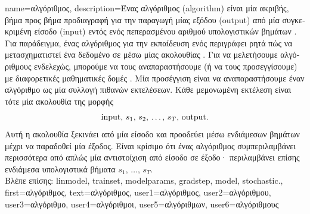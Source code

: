 {name={\foreignlanguage{greek}{αλγόριθμος}},
 	description={\foreignlanguage{greek}{Ένας} 
		\foreignlanguage{greek}{αλγόριθμος} (algorithm) \foreignlanguage{greek}{είναι μία ακριβής, βήμα προς βήμα προδιαγραφή για την  
		παραγωγή μίας εξόδου} (output) \foreignlanguage{greek}{από μία συγκεκριμένη είσοδο} (input) \foreignlanguage{greek}{εντός ενός πεπερασμένου 
		αριθμού υπολογιστικών βημάτων} \cite{Cormen:2022aa}. \foreignlanguage{greek}{Για παράδειγμα, ένας αλγόριθμος για την εκπαίδευση ενός} 
		 \foreignlanguage{greek}{περιγράφει ρητά πώς να μετασχηματιστεί ένα δεδομένο}  
		\foreignlanguage{greek}{σε}  \foreignlanguage{greek}{μέσω μίας ακολουθίας} 
		. \foreignlanguage{greek}{Για να μελετήσουμε αλγόριθμους ενδελεχώς, μπορούμε να τους αναπαραστήσουμε 
		(ή να τους προσεγγίσουμε) με διαφορετικές μαθηματικές δομές} \cite{Sipser2013}. \foreignlanguage{greek}{Μία προσέγγιση είναι να 
		αναπαραστήσουμε έναν αλγόριθμο ως μία συλλογή πιθανών εκτελέσεων. Κάθε μεμονωμένη εκτέλεση είναι τότε μία ακολουθία της  
		μορφής $${\rm input}, \,s_1, \,s_2, \,\ldots, \,s_T, \,{\rm output}.$$ Αυτή η ακολουθία ξεκινάει από μία είσοδο και προοδεύει μέσω ενδιάμεσων βημάτων 
		μέχρι να παραδοθεί μία έξοδος. Είναι κρίσιμο ότι ένας αλγόριθμος συμπεριλαμβάνει περισσότερα από απλώς μία αντιστοίχιση από είσοδο 
		σε έξοδο· περιλαμβάνει επίσης ενδιάμεσα υπολογιστικά βήματα} $s_1, \,\ldots, \,s_T$.\\
		\foreignlanguage{greek}{Βλέπε επίσης:} \gls{linmodel}, \gls{trainset}, \glspl{modelparam}, \gls{gradstep}, \gls{model}, \gls{stochastic}.},
	first={\foreignlanguage{greek}{αλγόριθμος}},
	text={\foreignlanguage{greek}{αλγόριθμος}},
	user1={\foreignlanguage{greek}{αλγόριθμος}}, %
	user2={\foreignlanguage{greek}{αλγόριθμου}}, %
	user3={\foreignlanguage{greek}{αλγόριθμο}}, %
	user4={\foreignlanguage{greek}{αλγόριθμοι}}, %
	user5={\foreignlanguage{greek}{αλγόριθμων}}, %
	user6={\foreignlanguage{greek}{αλγόριθμους}} %
}

